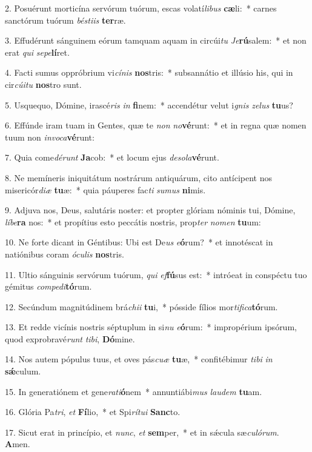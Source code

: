 2. Posuérunt morticína servórum tuórum, escas volatí\textit{li}\textit{bus} \textbf{cæ}li:~*  carnes sanctórum tuórum \textit{bés}\textit{ti}\textit{is} \textbf{ter}ræ.\

3. Effudérunt sánguinem eórum tamquam aquam in circúi\textit{tu} \textit{Je}\textbf{rú}salem:~*  et non erat \textit{qui} \textit{se}\textit{pe}\textbf{lí}ret.\

4. Facti sumus oppróbrium vi\textit{cí}\textit{nis} \textbf{nos}tris:~*  subsannátio et illúsio his, qui in cir\textit{cú}\textit{i}\textit{tu} \textbf{nos}tro sunt.\

5. Usquequo, Dómine, irascé\textit{ris} \textit{in} \textbf{fi}nem:~*  accendétur velut i\textit{gnis} \textit{ze}\textit{lus} \textbf{tu}us?\

6. Effúnde iram tuam in Gentes, quæ te \textit{non} \textit{no}\textbf{vé}runt:~*  et in regna quæ nomen tuum non \textit{in}\textit{vo}\textit{ca}\textbf{vé}runt:\

7. Quia come\textit{dé}\textit{runt} \textbf{Ja}cob:~*  et locum ejus \textit{de}\textit{so}\textit{la}\textbf{vé}runt.\

8. Ne memíneris iniquitátum nostrárum antiquárum, cito antícipent nos misericór\textit{di}\textit{æ} \textbf{tu}æ:~*  quia páuperes fac\textit{ti} \textit{su}\textit{mus} \textbf{ni}mis.\

9. Adjuva nos, Deus, salutáris noster: et propter glóriam nóminis tui, Dómine, \textit{lí}\textit{be}\textbf{ra} nos:~*  et propítius esto peccátis nostris, prop\textit{ter} \textit{no}\textit{men} \textbf{tu}um:\

10. Ne forte dicant in Géntibus: Ubi est De\textit{us} \textit{e}\textbf{ó}rum?~*  et innotéscat in natiónibus coram \textit{ó}\textit{cu}\textit{lis} \textbf{nos}tris.\

11. Ultio sánguinis servórum tuórum, \textit{qui} \textit{ef}\textbf{fú}sus est:~*  intróeat in conspéctu tuo gémitus \textit{com}\textit{pe}\textit{di}\textbf{tó}rum.\

12. Secúndum magnitúdinem brá\textit{chi}\textit{i} \textbf{tu}i,~*  pósside fílios mor\textit{ti}\textit{fi}\textit{ca}\textbf{tó}rum.\

13. Et redde vicínis nostris séptuplum in si\textit{nu} \textit{e}\textbf{ó}rum:~*  impropérium ipsórum, quod exprobravé\textit{runt} \textit{ti}\textit{bi}, \textbf{Dó}mine.\

14. Nos autem pópulus tuus, et oves pás\textit{cu}\textit{æ} \textbf{tu}æ,~*  confitébimur \textit{ti}\textit{bi} \textit{in} \textbf{sǽ}culum.\

15. In generatiónem et gene\textit{ra}\textit{ti}\textbf{ó}nem~*  annuntiábi\textit{mus} \textit{lau}\textit{dem} \textbf{tu}am.\

16. Glória Pa\textit{tri}, \textit{et} \textbf{Fí}lio,~*  et Spi\textit{rí}\textit{tu}\textit{i} \textbf{Sanc}to.\

17. Sicut erat in princípio, et \textit{nunc}, \textit{et} \textbf{sem}per,~*  et in sǽcula sæ\textit{cu}\textit{ló}\textit{rum}. \textbf{A}men.\

